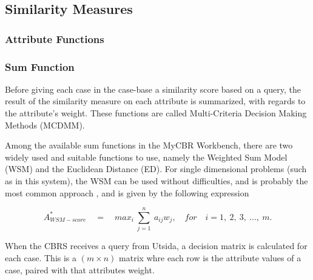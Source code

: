\subsection{Similarity Measures}

\subsubsection{Attribute Functions}

\subsubsection{Sum Function}
Before giving each case in the case-base a similarity score based on a query, the result of the similarity measure on each attribute is summarized, with regards to the attribute's weight. These functions are called Multi-Criteria Decision Making Methods (MCDMM).

Among the available sum functions in the MyCBR Workbench, there are two widely used and suitable functions to use, namely the Weighted Sum Model (WSM) and the Euclidean Distance (ED). For single dimensional problems (such as in this system), the WSM can be used without difficulties, and is probably the most common approach \cite{triantaphyllou2000multi}, and is given by the following expression \cite{fishburn1967letter}

\begin{displaymath}
    A^{*}_{WSM-score}\quad =\quad max_{i}\  \sum\limits_{j = 1}^{n}\  a_{ij}w_{j},\quad for \quad i =1,\ 2,\ 3,\ ...,\ m.
\end{displaymath}

When the CBRS receives a query from Utsida, a decision matrix is calculated for each case. This is a $(m \times n)$ matrix whre each row is the attribute values of a case, paired with that attributes weight. 


